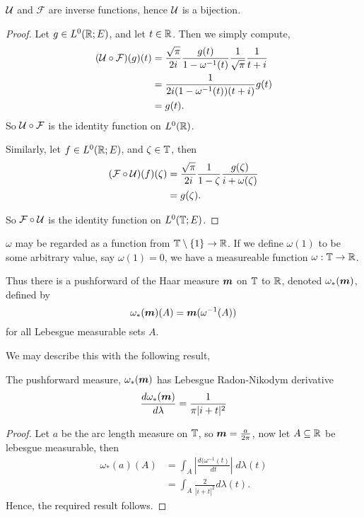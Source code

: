 \documentclass{unswmaths}
\begin{document}
\begin{lemma}
    $\mathcal{U}$ and $\mathcal{F}$ are inverse functions, hence $\mathcal{U}$ is a bijection.
\end{lemma}
\begin{proof}
    Let $g \in L^0(\mathbb{R};E)$, and let $t \in \mathbb{R}$. Then we simply compute,
    \begin{align*}
        (\mathcal{U}\circ\mathcal{F})(g)(t) &= \frac{\sqrt{\pi}}{2i}\frac{g(t)}{1-\omega^{-1}(t)} \frac{1}{\sqrt{\pi}}\frac{1}{t+i}\\
        &= \frac{1}{2i(1-\omega^{-1}(t))(t+i)}g(t)\\
        &= g(t).
    \end{align*}
    So $\mathcal{U}\circ \mathcal{F}$ is the identity function on $L^0(\mathbb{R})$.
    
    Similarly, let $f \in L^0(\mathbb{R};E)$, and $\zeta \in \mathbb{T}$, then
    \begin{align*}
        (\mathcal{F}\circ\mathcal{U})(f)(\zeta) &= \frac{\sqrt{\pi}}{2i}\frac{1}{1-\zeta}\frac{g(\zeta)}{i+\omega(\zeta)}\\
        &= g(\zeta).
    \end{align*}
    
    So $\mathcal{F}\circ\mathcal{U}$ is the identity function on $L^0(\mathbb{T};E)$.
\end{proof}

$\omega$ may be regarded as a function from $\mathbb{T}\setminus\{1\}\rightarrow \mathbb{R}$. 
If we define $\omega(1)$ to be some arbitrary value, say $\omega(1) = 0$, we
have a measureable function $\omega:\mathbb{T}\rightarrow\mathbb{R}$.

Thus there is a pushforward of the Haar measure $\boldsymbol{m}$ on $\mathbb{T}$
to $\mathbb{R}$, denoted $\omega_*(\boldsymbol{m})$, defined
by
\begin{equation*}
    \omega_*(\boldsymbol{m})(A) = \boldsymbol{m}(\omega^{-1}(A))    
\end{equation*}
for all Lebesgue measurable sets $A$.


We may describe this with the following result,
\begin{lemma}
    The pushforward measure, $\omega_*(\boldsymbol{m})$ has Lebesgue Radon-Nikodym 
    derivative
    \begin{equation*}
        \frac{d\omega_*(\boldsymbol{m})}{d\lambda} = \frac{1}{\pi|i+t|^2}
    \end{equation*}
\end{lemma}
\begin{proof}
    Let $a$ be the arc length measure on $\mathbb{T}$, so $\boldsymbol{m} = \frac{a}{2\pi}$, now
    let $A \subseteq \mathbb{R}$ be lebesgue measurable, then
    \begin{align*}
        \omega_*(a)(A) &= \int_A \left|\frac{d(\omega^{-1}(t)}{dt}\right|\;d\lambda(t)\\
        &= \int_A \frac{2}{|i+t|^2}d\lambda(t).
    \end{align*}
    Hence, the required result follows.
\end{proof}
\end{document}
